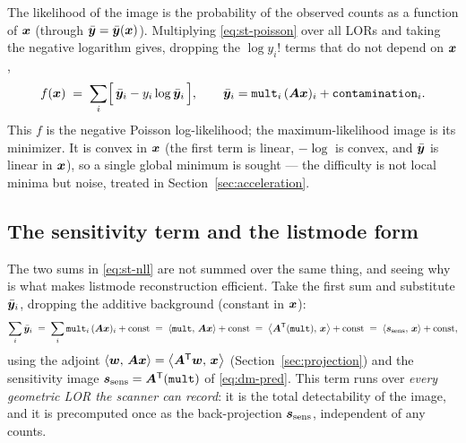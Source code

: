 The likelihood of the image is the probability of the observed counts as a
function of $\bm{x}$ (through $\bar{\bm{y}}=\bar{\bm{y}}(\bm{x})$). Multiplying \eqref{eq:st-poisson}
over all LORs and taking the negative logarithm gives, dropping the
$\log y_i!$ terms that do not depend on $\bm{x}$,
\begin{equation}
  f(\bm{x}) \;=\; \sum_i \Bigl[\,\bar{\bm{y}}_i - y_i \log \bar{\bm{y}}_i\,\Bigr],
  \qquad
  \bar{\bm{y}}_i = \texttt{mult}_i\,(\bm{A}\bm{x})_i + \texttt{contamination}_i .
  \label{eq:st-nll}
\end{equation}
This $f$ is the negative Poisson log-likelihood; the maximum-likelihood image is
its minimizer. It is convex in $\bm{x}$ (the first term is linear, $-\log$ is
convex, and $\bar{\bm{y}}$ is linear in $\bm{x}$), so a single global minimum is sought ---
the difficulty is not local minima but noise, treated in
Section~\ref{sec:acceleration}.

\subsection{The sensitivity term and the listmode form}
\label{sec:statistics:listmode}

The two sums in \eqref{eq:st-nll} are not summed over the same thing, and seeing
why is what makes listmode reconstruction efficient. Take the first sum and
substitute $\bar{\bm{y}}_i$, dropping the additive background (constant in $\bm{x}$):
\begin{equation}
  \sum_i \bar{\bm{y}}_i \;=\; \sum_i \texttt{mult}_i\,(\bm{A}\bm{x})_i + \text{const}
  \;=\; \left\langle \texttt{mult},\, \bm{A}\bm{x}\right\rangle + \text{const}
  \;=\; \left\langle \bm{A}^{\mathsf{T}}(\texttt{mult}),\, \bm{x}\right\rangle + \text{const}
  \;=\; \left\langle \bm{s}_{\mathrm{sens}},\, \bm{x}\right\rangle + \text{const},
  \label{eq:st-sens}
\end{equation}
using the adjoint $\left\langle \bm w,\, \bm{A}\bm{x}\right\rangle=\left\langle \bm{A}^{\mathsf{T}}\bm w,\, \bm{x}\right\rangle$
(Section~\ref{sec:projection}) and the sensitivity image
$\bm{s}_{\mathrm{sens}}=\bm{A}^{\mathsf{T}}(\texttt{mult})$ of \eqref{eq:dm-pred}. This term runs over
\emph{every geometric LOR the scanner can record}: it is the total detectability
of the image, and it is precomputed once as the back-projection $\bm{s}_{\mathrm{sens}}$,
independent of any counts.

